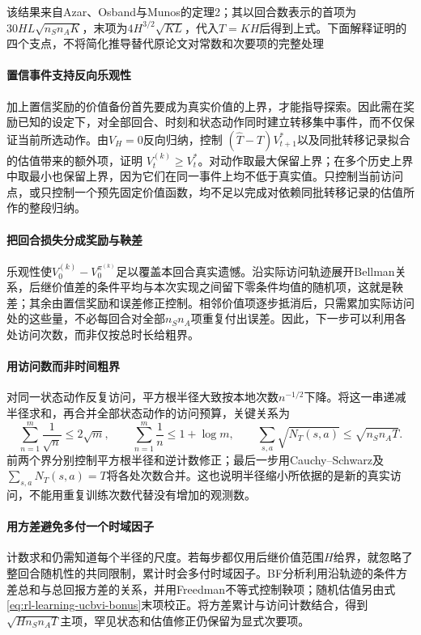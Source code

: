 该结果来自Azar、Osband与Munos的定理2；其以回合数表示的首项为$30HL\sqrt{n_Sn_AK}$，末项为$4H^{3/2}\sqrt{KL}$，代入$T=KH$后得到上式。下面解释证明的四个支点，不将简化推导替代原论文对常数和次要项的完整处理

\paragraph{置信事件支持反向乐观性}
加上置信奖励的价值备份首先要成为真实价值的上界，才能指导探索。因此需在奖励已知的设定下，对全部回合、时刻和状态动作同时建立转移集中事件，而不仅保证当前所选动作。由$V_H=0$反向归纳，控制
$(\widehat T-T)V^*_{t+1}$以及同批转移记录拟合的估值带来的额外项，证明
$V_t^{(k)}\geq V_t^*$。对动作取最大保留上界；在多个历史上界中取最小也保留上界，因为它们在同一事件上均不低于真实值。只控制当前访问点，或只控制一个预先固定价值函数，均不足以完成对依赖同批转移记录的估值所作的整段归纳。

\paragraph{把回合损失分成奖励与鞅差}
乐观性使$V_0^{(k)}-V_0^{\pi^{(k)}}$足以覆盖本回合真实遗憾。沿实际访问轨迹展开Bellman关系，后继价值差的条件平均与本次实现之间留下零条件均值的随机项，这就是鞅差；其余由置信奖励和误差修正控制。相邻价值项逐步抵消后，只需累加实际访问处的这些量，不必每回合对全部$n_Sn_A$项重复付出误差。因此，下一步可以利用各处访问次数，而非仅按总时长给粗界。

\paragraph{用访问数而非时间粗界}
对同一状态动作反复访问，平方根半径大致按本地次数$n^{-1/2}$下降。将这一串递减半径求和，再合并全部状态动作的访问预算，关键关系为
\[
  \sum_{n=1}^{m}\frac1{\sqrt n}\leq2\sqrt m,\qquad
  \sum_{n=1}^{m}\frac1n\leq1+\log m,\qquad
  \sum_{s,a}\sqrt{N_T(s,a)}\leq\sqrt{n_Sn_AT}.
\]
前两个界分别控制平方根半径和逆计数修正；最后一步用Cauchy--Schwarz及$\sum_{s,a}N_T(s,a)=T$将各处次数合并。这也说明半径缩小所依据的是新的真实访问，不能用重复训练次数代替没有增加的观测数。

\paragraph{用方差避免多付一个时域因子}
计数求和仍需知道每个半径的尺度。若每步都仅用后继价值范围$H$给界，就忽略了整回合随机性的共同限制，累计时会多付时域因子。BF分析利用沿轨迹的条件方差总和与总回报方差的关系，并用Freedman不等式控制鞅项；随机估值另由式\eqref{eq:rl-learning-ucbvi-bonus}末项校正。将方差累计与访问计数结合，得到$\sqrt{Hn_Sn_AT}$主项，罕见状态和估值修正仍保留为显式次要项。


